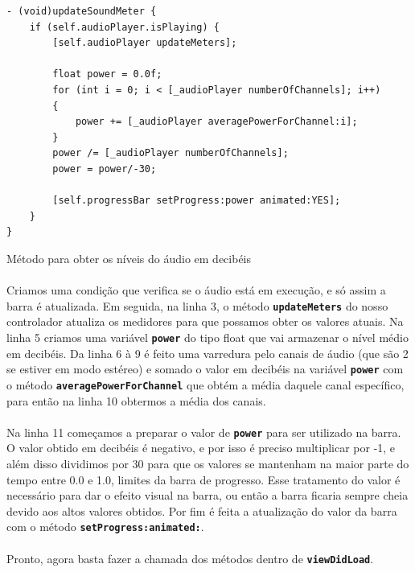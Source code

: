 \documentclass[a4paper,12pt,brazil,doubleside]{book}
\begin{document}
\begin{singlespace}
\begin{listing}[H]
\begin{verbatim}
- (void)updateSoundMeter {
    if (self.audioPlayer.isPlaying) {
        [self.audioPlayer updateMeters];
    
        float power = 0.0f;
        for (int i = 0; i < [_audioPlayer numberOfChannels]; i++)
        {
            power += [_audioPlayer averagePowerForChannel:i];
        }
        power /= [_audioPlayer numberOfChannels];
        power = power/-30;
        
        [self.progressBar setProgress:power animated:YES];
    }
}
\end{verbatim}
\caption{Método para obter os níveis do áudio em decibéis}
\end{listing}

\paragraph{}Criamos uma condição que verifica se o áudio está em execução, e só assim a barra é atualizada. Em seguida, na linha 3, o método \texttt{\textbf{updateMeters}} do nosso controlador atualiza os medidores para que possamos obter os valores atuais. Na linha 5 criamos uma variável \texttt{\textbf{power}} do tipo float que vai armazenar o nível médio em decibéis. Da linha 6 à 9 é feito uma varredura pelo canais de áudio (que são 2 se estiver em modo estéreo) e somado o valor em decibéis na variável \texttt{\textbf{power}} com o método \texttt{\textbf{averagePowerForChannel}} que obtém a média daquele canal específico, para então na linha 10 obtermos a média dos canais.
\paragraph{}Na linha 11 começamos a preparar o valor de \texttt{\textbf{power}} para ser utilizado na barra. O valor obtido em decibéis é negativo, e por isso é preciso multiplicar por -1, e além disso dividimos por 30 para que os valores se mantenham na maior parte do tempo entre 0.0 e 1.0, limites da barra de progresso. Esse tratamento do valor é necessário para dar o efeito visual na barra, ou então a barra ficaria sempre cheia devido aos altos valores obtidos. Por fim é feita a atualização do valor da barra com o método \texttt{\textbf{setProgress:animated:}}.
\paragraph{}Pronto, agora basta fazer a chamada dos métodos dentro de \texttt{\textbf{viewDidLoad}}.


\end{singlespace}
\end{document}
